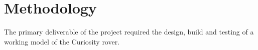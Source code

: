 \chapter{Methodology}
  The primary deliverable of the project required the design, build and testing of a working model of the Curiosity rover. 